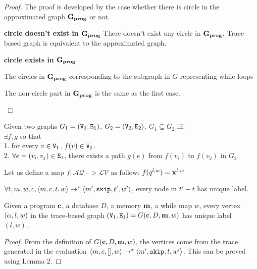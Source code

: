 \documentclass[a4paper,11pt]{article}
\begin{document}
{\begin{proof}
%
The proof is developed by the case whether there is circle in the approximated graph $\mathtt{\bf{G_{prog}}}$ or not.
\begin{mainitem}
	\item
	\textbf{circle doesn't exist in $\mathtt{\bf{G_{prog}}}$}
	There doesn't exist any circle in $\mathtt{\bf{G_{prog}}}$.
	Trace-based graph is equivalent to the approximated graph.
%
	\item
	\textbf{circle exists in $\mathtt{\bf{G_{prog}}}$}
	\begin{enumsub}
		\item
		The circles in $\mathtt{\bf{G_{prog}}}$ corresponding to the subgraph in $G$ representing while loops 
		\item
		The non-circle part in $\mathtt{\bf{G_{prog}}}$ is the same as the first case.
	\end{enumsub}
\end{mainitem}
\end{proof}
}

\begin{defn}
[Subgraph]
Given two graphs $G_1 = (\mathtt{V}_1, \mathtt{E}_1)$, 
$G_2 = (\mathtt{V}_2, \mathtt{E}_2)$, $G_1 \subseteq G_2$ iff:\\
$\exists f, g$ so that \\
1. for every $v \in \mathtt{V}_1$, $f(v) \in \mathtt{V}_2$. 
\\
2. $\forall e=(v_i, v_j) \in \mathtt{E}_1$, there exists a path $g(e)$ from $f(v_i)$ to $f(v_2)$ in $G_2$.
\end{defn}
%
%
\begin{defn}
\label{lem:vertexmap}
Let us define a map $f: \mathcal{AQ} -> \mathcal{LV} $ as follow:
$f(q^{l,w}) = \boldsymbol{\mathbf{x}}^{l,w}$ 
\end{defn}

\begin{lem}
 $\forall t,m,w,c, \langle m, c, t, w \rangle \to^{*} \langle m', \mathtt{skip}, t', w' \rangle$, every node in $t'-t$ has unique label.
\end{lem}

\begin{lem}
Given a program $\boldsymbol{\mathbf{c}}$, a database $D$, 
a memory $\boldsymbol{\mathbf{m}}$, 
a while map $w$, every vertex $(\alpha, l, w)$ in the trace-based graph $(\mathtt{V}_1, \mathtt{E}_1) = G(\boldsymbol{\mathbf{c}}, D, \boldsymbol{\mathbf{m}}, w)$ 
has unique label $(l,w)$. 
\end{lem}
\begin{proof}
From the definition of $G(\boldsymbol{\mathbf{c}}, D, \boldsymbol{\mathbf{m}}, w)$, 
the vertices come from the trace generated in the evaluation $ \langle m,c, [], w  \rangle \to^{*} \langle m', \mathtt{skip}, t,w' \rangle$.
 This can be proved using Lemma 2.
\end{proof}
\end{document}
